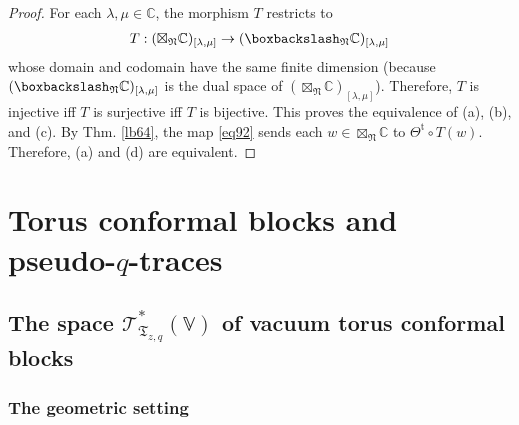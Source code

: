 \documentclass[11pt,b5paper,notitlepage]{article}
\theoremstyle{definition}
\theoremstyle{plain}
\newcommand{\tr}{\mathrm{t}} %
\newcommand{\Vbb}{\mathbb V}
\newcommand{\Cbb}{\mathbb C}
\newcommand{\<}{\left\langle}
\renewcommand{\>}{\right\rangle}
\newcommand{\ST}{\mathscr{T}}
\newcommand{\bbs}{\boxbackslash}
\newcommand{\ft}{{\mathfrak T}}
\newcommand{\fn}{\mathfrak{N}}
\numberwithin{equation}{section}
\begin{document}
\begin{proof}
For each $\lambda,\mu\in\Cbb$, the morphism $T$ restricts to
	\begin{gather}\label{eq92}
		T:(\boxtimes_\fn\Cbb)_{[\lambda,\mu]}\rightarrow (\bbs_\fn\Cbb)_{[\lambda,\mu]}
	\end{gather}
whose domain and codomain have the same finite dimension (because $(\bbs_\fn\Cbb)_{[\lambda,\mu]}$ is the dual space of $(\boxtimes_\fn\Cbb)_{[\lambda,\mu]}$). Therefore, $T$ is injective iff $T$ is surjective iff $T$ is bijective. This proves the equivalence of (a), (b), and (c). By Thm. \ref{lb64}, the map \eqref{eq92} sends each $w\in\boxtimes_\fn\Cbb$ to $\Theta^\tr\circ T(w)$. Therefore, (a) and (d) are equivalent.
\end{proof}














\section{Torus conformal blocks and pseudo-$q$-traces}



\subsection{The space $\ST^*_{\ft_{z,q}}(\Vbb)$ of vacuum torus conformal blocks}


\subsubsection{The geometric setting}\label{lb67}
\end{document}
